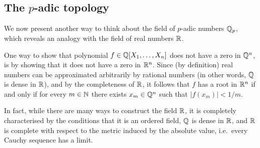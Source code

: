 \documentclass[12pt, leqno, british]{amsart}
\begin{document}
\subsection{The $p$-adic topology}
We now present another way to think about the field of $p$-adic numbers $\mathbb Q_p$, which reveals an analogy with the field of real numbers $\mathbb R$.

One way to show that polynomial $f \in \mathbb Q[X_1, \ldots, X_n]$ does not have a zero in $\mathbb Q^n$, is by showing that it does not have a zero in $\mathbb R^n$.
Since (by definition) real numbers can be approximated arbitrarily by rational numbers (in other words, $\mathbb Q$ is dense in $\mathbb R$), and by the completeness of $\mathbb R$, it follows that $f$ has a root in $\mathbb R^n$ if and only if for every $m \in \mathbb N$ there exists $x_m \in \mathbb Q^n$ such that $\lvert f(x_m) \rvert < 1/m$.

In fact, while there are many ways to construct the field $\mathbb R$, it is completely characterised by the conditions that it is an ordered field, $\mathbb Q$ is dense in $\mathbb R$, and $\mathbb R$ is complete with respect to the metric induced by the absolute value, i.e.~every Cauchy sequence has a limit.
\end{document}

